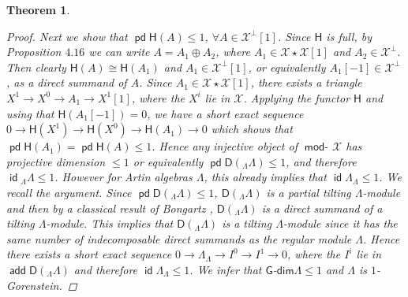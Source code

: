 \documentclass[oneside, a4paper,reqno]{amsart}
\numberwithin{equation}{section}
\newtheorem{thm}{Theorem}[section]
\theoremstyle{definition}
\begin{document}
\begin{thm}
\begin{proof}
Next we show that $\operatorname{\mathsf{pd}}\mathsf{H}(A) \leq 1$, $\forall A \in {\mathcal X}^{\bot}[1]$. Since $\mathsf{H}$ is full, by Proposition $4.16$  we can write $A = A_{1} \oplus A_{2}$, where $A_{1} \in {\mathcal X}\star {\mathcal X}[1]$ and $A_{2} \in {\mathcal X}^{\bot}$. Then clearly $\mathsf{H}(A) \cong \mathsf{H}(A_{1})$ and $A_{1} \in {\mathcal X}^{\bot}[1]$, or equivalently $A_{1}[-1] \in {\mathcal X}^{\bot}$, as a direct summand of $A$. Since $A_{1} \in {\mathcal X}\star {\mathcal X}[1]$, there exists a triangle $X^{1} {\longrightarrow} X^{0} {\longrightarrow} A_{1} {\longrightarrow} X^{1}[1]$, where the $X^{i}$ lie in ${\mathcal X}$. Applying the functor $\mathsf{H}$ and using that $\mathsf{H}(A_{1}[-1]) = 0$, we have a short exact sequence $0 {\longrightarrow} \mathsf{H}(X^{1}) {\longrightarrow} \mathsf{H}(X^{0}) {\longrightarrow} \mathsf{H}(A_{1}) {\longrightarrow} 0$ which shows that $\operatorname{\mathsf{pd}}\mathsf{H}(A_{1}) = \operatorname{\mathsf{pd}}\mathsf{H}(A) \leq 1$. Hence any injective object of $\operatorname*{\mathsf{mod}-\!}{\mathcal X}$ has projective dimension $\leq 1$ or equivalently $\operatorname{\mathsf{pd}}\mathsf{D}({_{\Lambda}}\Lambda) \leq 1$, and therefore  $\operatorname*{\mathsf{id}}{_{\Lambda}}\Lambda \leq 1$. However for Artin algebras $\Lambda$, this already implies that  $\operatorname*{\mathsf{id}}\Lambda_{\Lambda} \leq 1$. We recall the argument. Since $\operatorname{\mathsf{pd}}\mathsf{D}({_{\Lambda}}\Lambda) \leq 1$, $\mathsf{D}({_{\Lambda}}\Lambda)$ is a partial tilting  $\Lambda$-module and then by a classical result of Bongartz \cite{Bongartz}, $\mathsf{D}({_{\Lambda}}\Lambda)$ is a direct summand of a tilting $\Lambda$-module.  This implies that $\mathsf{D}({_{\Lambda}}\Lambda)$ is a tilting $\Lambda$-module since it has the same number of indecomposable direct summands as the regular module $\Lambda$. Hence there exists a short exact sequence $0 {\longrightarrow} \Lambda_{\Lambda} {\longrightarrow} I^{0} {\longrightarrow} I^{1} {\longrightarrow} 0$, where the $I^{i}$ lie in $\operatorname*{\mathsf{add}}\mathsf{D}({_{\Lambda}}\Lambda)$ and therefore $\operatorname*{\mathsf{id}}\Lambda_{\Lambda} \leq 1$. We infer that $\mathsf{G}$-$\mathsf{dim}\Lambda \leq 1$ and  $\Lambda$  is $1$-Gorenstein.
  

\end{proof}
\end{thm}
\end{document}
